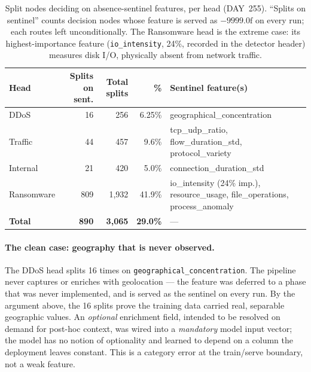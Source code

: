 \begin{table}[h]
    \centering
    \footnotesize
    \caption{Split nodes deciding on absence-sentinel features, per head
        (DAY~255). ``Splits on sentinel'' counts decision nodes whose feature is
        served as $-9999.0\text{f}$ on every run; each routes left unconditionally.
        The Ransomware head is the extreme case: its highest-importance feature
        (\texttt{io\_intensity}, 24\%, recorded in the detector header) measures
        disk I/O, physically absent from network traffic.}
    \label{tab:deadfeatures}
    \begin{tabular}{lrrrl}
        \toprule
        \textbf{Head} & \textbf{Splits on sent.} & \textbf{Total splits} &
        \textbf{\%} & \textbf{Sentinel feature(s)} \\
        \midrule
        DDoS       & 16  & 256   & 6.25\% & geographical\_concentration \\
        Traffic    & 44  & 457   & 9.6\%  & tcp\_udp\_ratio, flow\_duration\_std, protocol\_variety \\
        Internal   & 21  & 420   & 5.0\%  & connection\_duration\_std \\
        Ransomware & 809 & 1{,}932 & 41.9\% & io\_intensity (24\% imp.), resource\_usage, file\_operations, process\_anomaly \\
        \midrule
        \textbf{Total} & \textbf{890} & \textbf{3{,}065} & \textbf{29.0\%} & --- \\
        \bottomrule
    \end{tabular}
\end{table}

\paragraph{The clean case: geography that is never observed.}
The DDoS head splits 16 times on \texttt{geographical\_concentration}. The
pipeline never captures or enriches with geolocation --- the feature was
deferred to a phase that was never implemented, and is served as the sentinel on
every run. By the argument above, the 16 splits prove the training data carried
real, separable geographic values. An \emph{optional} enrichment field, intended
to be resolved on demand for post-hoc context, was wired into a \emph{mandatory}
model input vector; the model has no notion of optionality and learned to depend
on a column the deployment leaves constant. This is a category error at the
train/serve boundary, not a weak feature.

